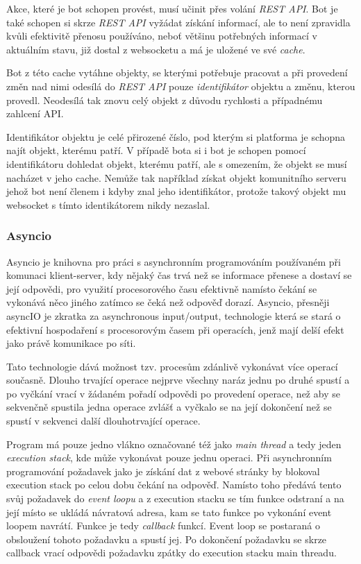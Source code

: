 \documentclass[
  program=inf,
biblatex=false,
sourcecodes=true,
joinlists=true,
  figures=true,
  tables=true,
  glossaries=true,
  index=false
]{kidiplom}
\begin{document}
Akce, které je bot schopen provést, musí učinit přes volání {\it REST API}. Bot je také
schopen si skrze {\it REST API} vyžádat získání informací, ale to není zpravidla kvůli efektivitě přenosu
používáno, neboť většinu potřebných informací v aktuálním stavu, již dostal z websocketu a má je uložené ve své
{\it cache}. 

Bot z této cache vytáhne objekty, se kterými potřebuje pracovat a při
provedení změn nad nimi odesílá do {\it REST API} pouze {\it identifikátor} objektu a změnu, kterou provedl.
Neodesílá tak znovu celý objekt z důvodu rychlosti a případnému zahlcení API.

Identifikátor objektu je celé přirozené číslo, pod kterým si platforma je schopna
najít objekt, kterému patří. V případě bota si i bot je schopen pomocí identifikátoru
dohledat objekt, kterému patří, ale s omezením, že objekt se musí nacházet v jeho cache. Nemůže tak například
získat objekt komunitního serveru jehož bot není členem i kdyby znal jeho identifikátor, protože
takový objekt mu websocket s tímto identikátorem nikdy nezaslal.

\subsubsection{Asyncio}
Asyncio je knihovna pro práci s asynchronním programováním používaném při komunaci klient-server, kdy nějaký čas trvá než
se informace přenese a dostaví se její odpovědi, pro využití procesorového času efektivně namísto čekání se vykonává
něco jiného zatímco se čeká než odpověď dorazí. \cite{asyncio} Asyncio, přesněji asyncIO je zkratka za asynchronous
input/output, technologie která se stará o efektivní hospodaření s procesorovým časem při operacích, jenž
mají delší efekt jako právě komunikace po síti.

Tato technologie dává možnost tzv.  procesům zdánlivě vykonávat více operací současně.
Dlouho trvající operace nejprve všechny naráz jednu po druhé spustí a 
po vyčkání vrací v žádaném pořadí odpovědi po provedení operace, než aby se sekvenčně spustila jedna operace zvlášť a vyčkalo se na 
její dokončení než se spustí v sekvenci další dlouhotrvající operace.

Program má pouze jedno vlákno označované též jako {\it main thread} a tedy jeden {\it execution stack}, kde 
může vykonávat pouze jednu operaci. Při asynchronním programování požadavek jako je získání dat z 
webové stránky by blokoval execution stack po celou dobu čekání na odpověď. Namísto toho předává tento svůj požadavek
do {\it event loopu} a z execution stacku se tím funkce odstraní a na její místo se ukládá návratová adresa, kam se tato funkce po vykonání event loopem navrátí.
Funkce je tedy {\it callback} funkcí.
Event loop se postaraná o obsloužení tohoto požadavku a spustí jej. Po dokončení požadavku se skrze callback vrací odpovědi
požadavku zpátky do execution stacku main threadu.
\end{document}
